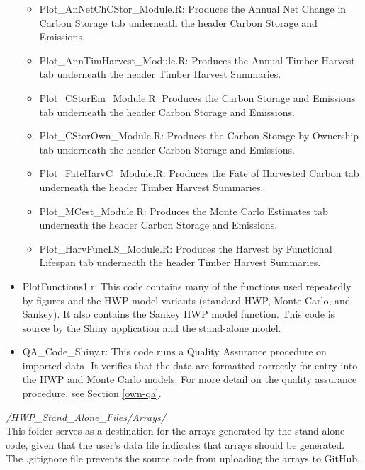 \documentclass[
  openany]{book}
\providecommand{\tightlist}{%
  \setlength{\itemsep}{0pt}\setlength{\parskip}{0pt}}
\begin{document}
\begin{itemize}
  \begin{itemize}
  \tightlist
  \item
    Plot\_AnNetChCStor\_Module.R: Produces the Annual Net Change in Carbon Storage tab underneath the header Carbon Storage and Emissions.\\
  \item
    Plot\_AnnTimHarvest\_Module.R: Produces the Annual Timber Harvest tab underneath the header Timber Harvest Summaries.\\
  \item
    Plot\_CStorEm\_Module.R: Produces the Carbon Storage and Emissions tab underneath the header Carbon Storage and Emissions.\\
  \item
    Plot\_CStorOwn\_Module.R: Produces the Carbon Storage by Ownership tab underneath the header Carbon Storage and Emissions.\\
  \item
    Plot\_FateHarvC\_Module.R: Produces the Fate of Harvested Carbon tab underneath the header Timber Harvest Summaries.\\
  \item
    Plot\_MCest\_Module.R: Produces the Monte Carlo Estimates tab underneath the header Carbon Storage and Emissions.\\
  \item
    Plot\_HarvFuncLS\_Module.R: Produces the Harvest by Functional Lifespan tab underneath the header Timber Harvest Summaries.
  \end{itemize}
\item
  PlotFunctions1.r: This code contains many of the functions used repeatedly by figures and the HWP model variants (standard HWP, Monte Carlo, and Sankey). It also contains the Sankey HWP model function. This code is source by the Shiny application and the stand-alone model.
\item
  QA\_Code\_Shiny.r: This code runs a Quality Assurance procedure on imported data. It verifies that the data are formatted correctly for entry into the HWP and Monte Carlo models. For more detail on the quality assurance procedure, see Section \ref{own-qa}.
\end{itemize}

\emph{/HWP\_Stand\_Alone\_Files/Arrays/}\\
This folder serves as a destination for the arrays generated by the stand-alone code, given that the user's data file indicates that arrays should be generated. The .gitignore file prevents the source code from uploading the arrays to GitHub.
\end{document}
